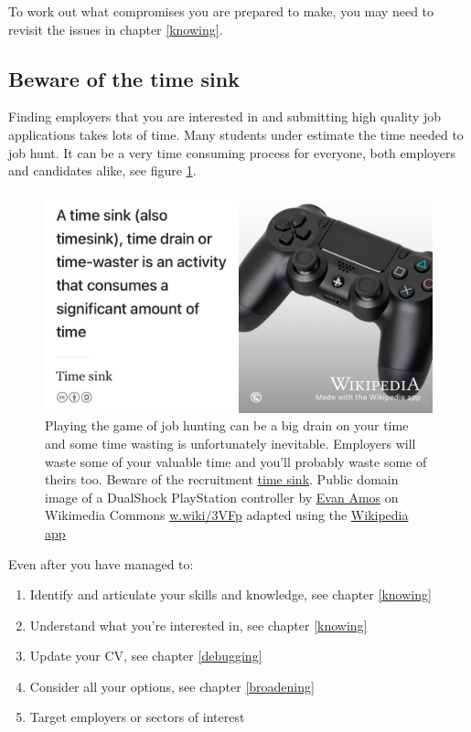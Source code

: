 \documentclass[
]{book}
\providecommand{\tightlist}{%
  \setlength{\itemsep}{0pt}\setlength{\parskip}{0pt}}
\begin{document}
To work out what compromises you are prepared to make, you may need to revisit the issues in chapter \ref{knowing}. 🤔

\hypertarget{timesink}{%
\subsection{Beware of the time sink}\label{timesink}}

Finding employers that you are interested in and submitting high quality job applications takes lots of time. Many students under estimate the time needed to job hunt. It can be a very time consuming process for everyone, both employers and candidates alike, see figure \ref{fig:timesink-fig}.

\begin{figure}

{\centering \includegraphics[width=0.98\linewidth]{images/timesink} 

}

\caption{Playing the game of job hunting can be a big drain on your time and some time wasting is unfortunately inevitable. Employers will waste some of your valuable time and you'll probably waste some of theirs too. Beware of the recruitment \href{https://en.wikipedia.org/wiki/Time_sink}{time sink}. Public domain image of a DualShock PlayStation controller by \href{https://en.wikipedia.org/wiki/Evan_Amos}{Evan Amos} on Wikimedia Commons \href{https://w.wiki/3VFp}{w.wiki/3VFp} adapted using the \href{https://apps.apple.com/gb/app/wikipedia/id324715238}{Wikipedia app}}\label{fig:timesink-fig}
\end{figure}



Even after you have managed to:

\begin{enumerate}
\def\labelenumi{\arabic{enumi}.}
\tightlist
\item
  Identify and articulate your skills and knowledge, see chapter \ref{knowing}
\item
  Understand what you're interested in, see chapter \ref{knowing}
\item
  Update your CV, see chapter \ref{debugging}
\item
  Consider all your options, see chapter \ref{broadening}
\item
  Target employers or sectors of interest
\end{enumerate}
\end{document}
